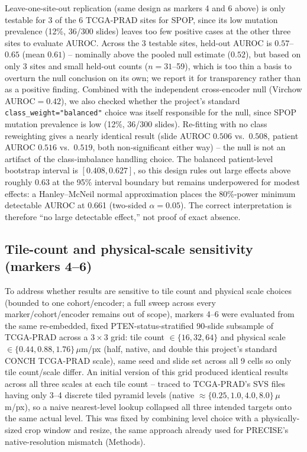 Leave-one-site-out replication (same design as markers 4 and 6 above) is only testable for 3 of
the 6 TCGA-PRAD sites for SPOP, since its low mutation prevalence (12\%, 36/300 slides) leaves
too few positive cases at the other three sites to evaluate AUROC. Across the 3 testable sites,
held-out AUROC is $0.57$--$0.65$ (mean $0.61$) -- nominally above the pooled null estimate
($0.52$), but based on only 3 sites and small held-out counts ($n=31$--59), which is too thin a
basis to overturn the null conclusion on its own; we report it for transparency rather than as
a positive finding. Combined with the independent cross-encoder null (Virchow AUROC$=0.42$), we
also checked whether
the project's standard \texttt{class\_weight="balanced"} choice was itself responsible for the
null, since SPOP mutation prevalence is low (12\%, 36/300 slides). Re-fitting with no class
reweighting gives a nearly identical result (slide AUROC $0.506$ vs.\ $0.508$, patient AUROC
$0.516$ vs.\ $0.519$, both non-significant either way) -- the null is not an artifact of the
class-imbalance handling choice. The balanced patient-level bootstrap interval is
$[0.408,0.627]$, so this design rules out large effects above roughly 0.63 at the 95\% interval
boundary but remains underpowered for modest effects: a Hanley--McNeil normal approximation
places the 80\%-power minimum detectable AUROC at 0.661 (two-sided $\alpha=0.05$). The correct
interpretation is therefore ``no large detectable effect,'' not proof of exact absence.

\subsection{Tile-count and physical-scale sensitivity (markers 4--6)}
\label{sec:res-scale-sensitivity}

To address whether results are sensitive to tile count and physical scale choices (bounded to
one cohort/encoder; a full sweep across every marker/cohort/encoder remains out of scope),
markers 4--6 were evaluated from the same re-embedded, fixed PTEN-status-stratified 90-slide
subsample of TCGA-PRAD across a $3\times3$ grid: tile count $\in\{16,32,64\}$ and physical
scale $\in\{0.44,0.88,1.76\}\,\mu$m/px (half, native, and double this project's standard CONCH
TCGA-PRAD scale), same seed and slide set across all 9 cells so only tile count/scale differ.
An initial version of this grid produced identical results across all three scales at each
tile count -- traced to TCGA-PRAD's SVS files having only 3--4 discrete tiled pyramid levels
(native $\approx\{0.25,1.0,4.0,8.0\}\,\mu$m/px), so a naive nearest-level lookup collapsed all
three intended targets onto the same actual level. This was fixed by combining level choice
with a physically-sized crop window and resize, the same approach already used for PRECISE's
native-resolution mismatch (Methods).

